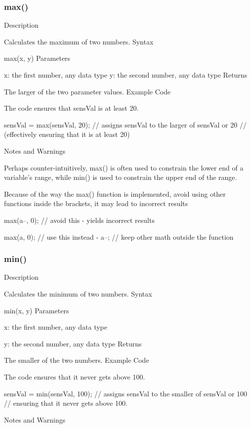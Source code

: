 \documentclass[12pt,a4paper]{report}  %
\begin{document}
\subsubsection{max()}\label{max}

Description

Calculates the maximum of two numbers.
Syntax

max(x, y)
Parameters

x: the first number, any data type y: the second number, any data type
Returns

The larger of the two parameter values.
Example Code

The code ensures that sensVal is at least 20.

sensVal = max(sensVal, 20); // assigns sensVal to the larger of sensVal or 20
                           // (effectively ensuring that it is at least 20)

Notes and Warnings

Perhaps counter-intuitively, max() is often used to constrain the lower end of a variable’s range, while min() is used to constrain the upper end of the range.

Because of the way the max() function is implemented, avoid using other functions inside the brackets, it may lead to incorrect results

max(a--, 0);   // avoid this - yields incorrect results

max(a, 0);           // use this instead -
a--;     // keep other math outside the function

\subsubsection{min()}\label{min}

Description

Calculates the minimum of two numbers.
Syntax

min(x, y)
Parameters

x: the first number, any data type

y: the second number, any data type
Returns

The smaller of the two numbers.
Example Code

The code ensures that it never gets above 100.

sensVal = min(sensVal, 100); // assigns sensVal to the smaller of sensVal or 100
                             // ensuring that it never gets above 100.

Notes and Warnings
\end{document}
